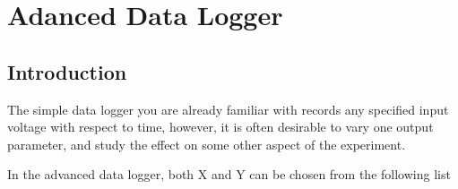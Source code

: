 \documentclass[a4paper,12pt,english]{sphinxmanual}
\begin{document}
\section{Adanced Data Logger}
\label{\detokenize{7.3:adanced-data-logger}}\label{\detokenize{7.3::doc}}

\subsection{Introduction}
\label{\detokenize{7.3:introduction}}
The simple data logger you are already familiar with records any
specified input voltage with respect to time, however, it is often
desirable to vary one output parameter, and study the effect on some
other aspect of the experiment.

In the advanced data logger, both X and Y can be chosen from the following list
\end{document}
